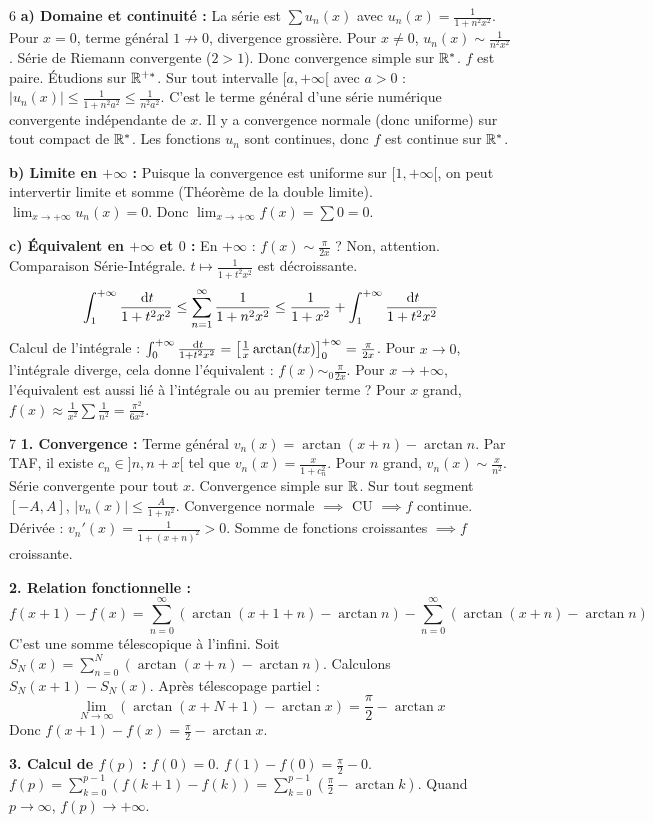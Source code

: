 \documentclass{prepacours}
\begin{document}
\begin{correction}{6}
\textbf{a) Domaine et continuité :}
La série est $\sum u_n(x)$ avec $u_n(x) = \frac{1}{1+n^2 x^2}$.
Pour $x=0$, terme général $1 \not\to 0$, divergence grossière.
Pour $x \neq 0$, $u_n(x) \sim \frac{1}{n^2 x^2}$. Série de Riemann convergente ($2 > 1$).
Donc convergence simple sur $\mathbb{R}^*$.
$f$ est paire. Étudions sur $\mathbb{R}^{+*}$.
Sur tout intervalle $[a, +\infty[$ avec $a>0$ :
$|u_n(x)| \le \frac{1}{1+n^2 a^2} \le \frac{1}{n^2 a^2}$.
C'est le terme général d'une série numérique convergente indépendante de $x$.
Il y a convergence normale (donc uniforme) sur tout compact de $\mathbb{R}^*$.
Les fonctions $u_n$ sont continues, donc $f$ est continue sur $\mathbb{R}^*$.

\textbf{b) Limite en $+\infty$ :}
Puisque la convergence est uniforme sur $[1, +\infty[$, on peut intervertir limite et somme (Théorème de la double limite).
$\lim_{x\to +\infty} u_n(x) = 0$.
Donc $\lim_{x\to +\infty} f(x) = \sum 0 = 0$.

\textbf{c) Équivalent en $+\infty$ et $0$ :}
En $+\infty$ : $f(x) \sim \frac{\pi}{2x}$ ? Non, attention.
Comparaison Série-Intégrale. $t \mapsto \frac{1}{1+t^2 x^2}$ est décroissante.
$$ \int_1^{+\infty} \frac{\,\mathrm{d}t}{1+t^2 x^2} \le \sum_{n=1}^\infty \frac{1}{1+n^2 x^2} \le \frac{1}{1+x^2} + \int_1^{+\infty} \frac{\,\mathrm{d}t}{1+t^2 x^2} $$
Calcul de l'intégrale : $\int_0^{+\infty} \frac{\,\mathrm{d}t}{1+t^2 x^2} = \left[\frac{1}{x} \arctan(tx)\right]_0^{+\infty} = \frac{\pi}{2x}$.
Pour $x \to 0$, l'intégrale diverge, cela donne l'équivalent : $f(x) \sim_0 \frac{\pi}{2x}$.
Pour $x \to +\infty$, l'équivalent est aussi lié à l'intégrale ou au premier terme ?
Pour $x$ grand, $f(x) \approx \frac{1}{x^2} \sum \frac{1}{n^2} = \frac{\pi^2}{6 x^2}$.
\end{correction}

\begin{correction}{7}
\textbf{1. Convergence :}
Terme général $v_n(x) = \arctan(x+n) - \arctan n$.
Par TAF, il existe $c_n \in ]n, n+x[$ tel que $v_n(x) = \frac{x}{1+c_n^2}$.
Pour $n$ grand, $v_n(x) \sim \frac{x}{n^2}$. Série convergente pour tout $x$.
Convergence simple sur $\mathbb{R}$.
Sur tout segment $[-A, A]$, $|v_n(x)| \le \frac{A}{1+n^2}$. Convergence normale $\implies$ CU $\implies f$ continue.
Dérivée : $v_n'(x) = \frac{1}{1+(x+n)^2} > 0$. Somme de fonctions croissantes $\implies f$ croissante.

\textbf{2. Relation fonctionnelle :}
$$ f(x+1) - f(x) = \sum_{n=0}^\infty (\arctan(x+1+n) - \arctan n) - \sum_{n=0}^\infty (\arctan(x+n) - \arctan n) $$
C'est une somme télescopique à l'infini.
Soit $S_N(x) = \sum_{n=0}^N (\arctan(x+n) - \arctan n)$.
Calculons $S_N(x+1) - S_N(x)$.
Après télescopage partiel :
$$ \lim_{N\to\infty} (\arctan(x+N+1) - \arctan x) = \frac{\pi}{2} - \arctan x $$
Donc $f(x+1) - f(x) = \frac{\pi}{2} - \arctan x$.

\textbf{3. Calcul de $f(p)$ :}
$f(0) = 0$.
$f(1) - f(0) = \frac{\pi}{2} - 0$.
$f(p) = \sum_{k=0}^{p-1} (f(k+1)-f(k)) = \sum_{k=0}^{p-1} (\frac{\pi}{2} - \arctan k)$.
Quand $p \to \infty$, $f(p) \to +\infty$.
\end{correction}
\end{document}
